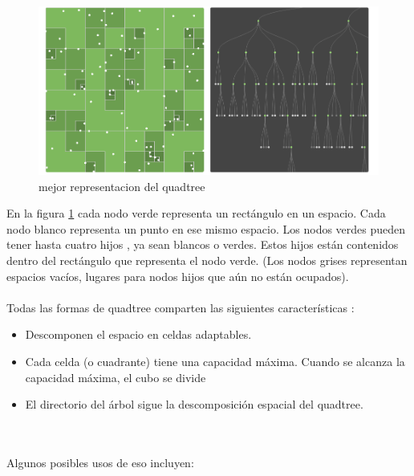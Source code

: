 \begin{figure}[H]%
\centering
\includegraphics[width=15cm]{imagenes/quad0.png}
\caption{mejor representacion  del quadtree}
\label{fig:repre}
\end{figure}

En la figura \ref{fig:repre} cada nodo verde representa un rectángulo en un espacio.
    Cada nodo blanco representa un punto en ese mismo espacio.
    Los nodos verdes pueden tener hasta cuatro hijos , ya sean blancos o verdes. Estos hijos están contenidos dentro del rectángulo que representa el nodo verde.
    (Los nodos grises representan espacios vacíos, lugares para nodos hijos  que aún no están ocupados).
\\    
\\
Todas las formas de quadtree comparten las siguientes  características\cite{quad3} :
  
    
\begin{itemize}
    \item Descomponen el espacio en celdas adaptables.
    \item  Cada celda (o cuadrante) tiene una capacidad máxima. Cuando se alcanza la capacidad máxima, el cubo se divide
    \item    El directorio del árbol sigue la descomposición espacial del quadtree. 
\end{itemize}
\\
\\
 Algunos posibles usos de eso incluyen:

